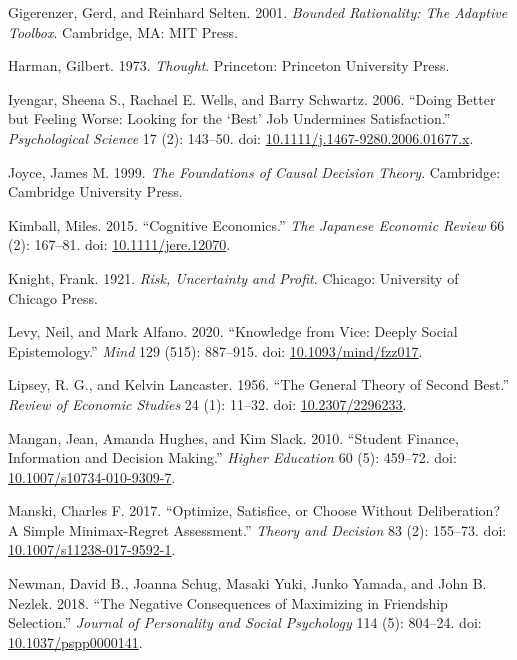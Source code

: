 \documentclass[
  10pt,
  letterpaper,
  DIV=11,
  numbers=noendperiod,
  twoside]{scrartcl}
\newlength{\cslhangindent}
\newenvironment{CSLReferences}[2] %
 {\begin{list}{}{%
  \setlength{\itemindent}{0pt}
  \setlength{\leftmargin}{0pt}
  \setlength{\parsep}{0pt}
  \ifodd #1
   \setlength{\leftmargin}{\cslhangindent}
   \setlength{\itemindent}{-1\cslhangindent}
  \fi
  \setlength{\itemsep}{#2\baselineskip}}}
 {\end{list}}
\begin{document}
\begin{CSLReferences}{1}{0}
Gigerenzer, Gerd, and Reinhard Selten. 2001. \emph{Bounded Rationality:
The Adaptive Toolbox}. Cambridge, MA: MIT Press.

Harman, Gilbert. 1973. \emph{Thought}. Princeton: Princeton University
Press.

Iyengar, Sheena S., Rachael E. Wells, and Barry Schwartz. 2006. {``Doing
Better but Feeling Worse: Looking for the {`Best'} Job Undermines
Satisfaction.''} \emph{Psychological Science} 17 (2): 143--50. doi:
\href{https://doi.org/10.1111/j.1467-9280.2006.01677.x}{10.1111/j.1467-9280.2006.01677.x}.

Joyce, James M. 1999. \emph{The Foundations of Causal Decision Theory}.
Cambridge: Cambridge University Press.

Kimball, Miles. 2015. {``Cognitive Economics.''} \emph{The Japanese
Economic Review} 66 (2): 167--81. doi:
\href{https://doi.org/10.1111/jere.12070}{10.1111/jere.12070}.

Knight, Frank. 1921. \emph{Risk, Uncertainty and Profit}. Chicago:
University of Chicago Press.

Levy, Neil, and Mark Alfano. 2020. {``Knowledge from Vice: Deeply Social
Epistemology.''} \emph{Mind} 129 (515): 887--915. doi:
\href{https://doi.org/10.1093/mind/fzz017}{10.1093/mind/fzz017}.

Lipsey, R. G., and Kelvin Lancaster. 1956. {``The General Theory of
Second Best.''} \emph{Review of Economic Studies} 24 (1): 11--32. doi:
\href{https://doi.org/10.2307/2296233}{10.2307/2296233}.

Mangan, Jean, Amanda Hughes, and Kim Slack. 2010. {``Student Finance,
Information and Decision Making.''} \emph{Higher Education} 60 (5):
459--72. doi:
\href{https://doi.org/10.1007/s10734-010-9309-7}{10.1007/s10734-010-9309-7}.

Manski, Charles F. 2017. {``Optimize, Satisfice, or Choose Without
Deliberation? A Simple Minimax-Regret Assessment.''} \emph{Theory and
Decision} 83 (2): 155--73. doi:
\href{https://doi.org/10.1007/s11238-017-9592-1}{10.1007/s11238-017-9592-1}.

Newman, David B., Joanna Schug, Masaki Yuki, Junko Yamada, and John B.
Nezlek. 2018. {``The Negative Consequences of Maximizing in Friendship
Selection.''} \emph{Journal of Personality and Social Psychology} 114
(5): 804--24. doi:
\href{https://doi.org/10.1037/pspp0000141}{10.1037/pspp0000141}.


\end{CSLReferences}
\end{document}

